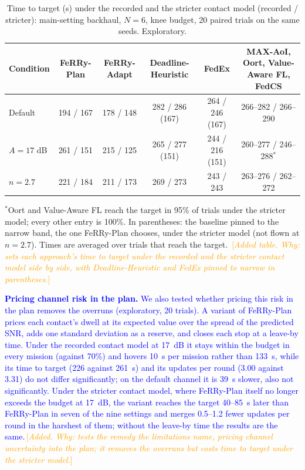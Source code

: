\documentclass[conference]{IEEEtran}
\newcommand{\sysname}{FeRRy}
\newcommand{\changenote}[1]{\textcolor{orange}{\,[\emph{#1}]}}
\begin{document}
\begin{table}[t]
\centering
\color{blue}
\caption{Time to target (s) under the recorded and the stricter contact model
(recorded / stricter): main-setting backhaul, \(N=6\), knee budget, 20 paired
trials on the same seeds. Exploratory.}
\label{tab:session}
\small
\setlength{\tabcolsep}{5pt}

\begin{tabular}{lccccc}
\hline
\textbf{Condition} &
\textbf{\sysname{}-Plan} &
\textbf{\sysname{}-Adapt} &
\textbf{Deadline-Heuristic} &
\textbf{FedEx} &
\textbf{MAX-AoI, Oort, Value-Aware FL, FedCS} \\
\hline
Default & 194 / 167 & 178 / 148 & 282 / 286 (167) & 264 / 246 (167) & 266--282 / 266--290 \\
\(A=17\) dB & 261 / 151 & 215 / 125 & 265 / 277 (151) & 244 / 216 (151) & 260--277 / 246--288\(^{\ast}\) \\
\(n=2.7\) & 221 / 184 & 211 / 173 & 269 / 273 & 243 / 243 & 263--276 / 262--272 \\
\hline
\end{tabular}

\vspace{2pt}
\footnotesize
\(^{\ast}\)Oort and Value-Aware FL reach the target in 95\% of trials under the
stricter model; every other entry is 100\%. In parentheses: the baseline pinned
to the narrow band, the one \sysname{}-Plan chooses, under the stricter model (not
flown at \(n=2.7\)). Times are averaged over trials that reach the target. \changenote{Added table. Why: sets each approach's time to target under the recorded and the stricter contact model side by side, with Deadline-Heuristic and FedEx pinned to narrow in parentheses.}
\end{table}

\textcolor{blue}{\textbf{Pricing channel risk in the plan.} We also tested
whether pricing this risk in the plan removes the overruns (exploratory, 20
trials). A variant of \sysname{}-Plan prices each contact's dwell at its expected
value over the spread of the predicted SNR, adds one standard deviation as a
reserve, and closes each stop at a leave-by time. Under the recorded contact
model at 17~dB it stays within the budget in every mission (against 70\%) and
hovers 10~s per mission rather than 133~s, while its time to target (226
against 261~s) and its updates per round (3.00 against 3.31) do not differ
significantly; on the default channel it is 39~s slower, also not
significantly. Under the stricter contact model, where \sysname{}-Plan itself
no longer exceeds the budget at 17~dB, the variant reaches the target 40--85~s
later than \sysname{}-Plan in seven of the nine settings and merges 0.5--1.2
fewer updates per round in the harshest of them; without the leave-by time the
results are the same.}\changenote{Added. Why: tests the remedy the limitations name, pricing channel uncertainty into the plan; it removes the overruns but costs time to target under the stricter model.}
\end{document}
